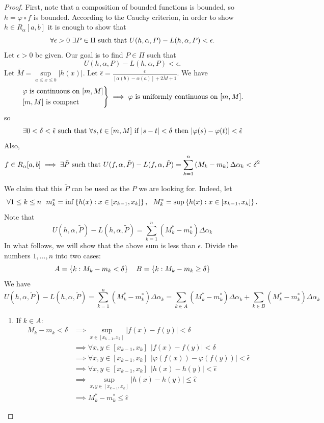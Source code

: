 \begin{proof}
    First, note that a composition of bounded functions is bounded, so $h = \varphi \circ f$ is bounded. According to the Cauchy criterion, in order to show $h \in R_\alpha[a,b]$ it is enough to show that 
    $$\forall \epsilon > 0 ~\exists P \in \Pi \text{ such that } U(h, \alpha, P) - L(h, \alpha, P) < \epsilon.$$
    Let $\epsilon > 0$ be given. Our goal is to find $P \in \Pi$ such that 
    $$U(h, \alpha, P) - L(h, \alpha, P) < \epsilon.$$
    Let $\tilde{M} = \sup \limits_{a \leq x \leq b} |h(x)|$. Let $\hat{\epsilon} = \frac{\epsilon}{[\alpha(b) - \alpha(a)] + 2\tilde{M} + 1}.$ We have
    $$\begin{rcases*}
        \varphi \text{ is continuous on } [m,M] \\
        [m,M] \text{ is compact}
    \end{rcases*} \implies \varphi \text{ is uniformly continuous on $[m,M]$.}$$
    so
    $$\exists 0 < \delta < \hat{\epsilon} \text{ such that } \forall s,t \in [m, M] \text{ if $|s-t| < \delta$ then $|\varphi(s)-\varphi(t)| < \hat{\epsilon}$}$$
    Also,
    $$f \in R_\alpha[a,b] \implies \exists \tilde{P} \text{ such that } U(f, \alpha, \tilde{P}) - L(f, \alpha, \tilde{P}) = \sum_{k=1}^{n}\left(M_k - m_k\right)\Delta \alpha_k < \delta^2$$

    We claim that this $\tilde{P}$ can be used as the $P$ we are looking for. Indeed, let 
    $$\forall 1 \leq k \leq n ~~m_k^* = \inf \left\{h(x) : x \in [x_{k-1},x_k]\right\}, ~~M_k^* = \sup \left\{h(x) : x \in [x_{k-1}, x_k]\right\}.$$
    Note that 
    $$U(h, \alpha, \tilde{P}) - L(h, \alpha, \tilde{P}) = \sum_{k=1}^{n}\left(M_k^* - m_k^*\right)\Delta \alpha_k$$
    In what follows, we will show that the above sum is less than $\epsilon$. Divide the numbers $1, ..., n$ into two cases:
    $$A = \left\{k : M_k - m_k < \delta\right\} ~~~B = \left\{k : M_k - m_k \geq \delta\right\}$$
    We have
    \begin{equation*}
        U(h, \alpha, \tilde{P}) - L(h, \alpha, \tilde{P}) = \sum_{k=1}^{n} \left(M_k^* - m_k^*\right)\Delta \alpha_k = \sum_{k \in A}\left(M_k^* - m_k^*\right)\Delta \alpha_k + \sum_{k \in B}\left(M_k^* - m_k^*\right)\Delta \alpha_k
        \tag{I}
    \end{equation*}
    \begin{enumerate}[$*)$]
        \item If $k \in A$:
        \begin{align*}
            M_k - m_k < \delta &\implies \sup \limits_{x \in [x_{k-1}, x_k]} |f(x) - f(y)| < \delta \\
            &\implies \forall x, y \in [x_{k-1}, x_k] ~~|f(x) - f(y)| < \delta \\
            &\implies \forall x, y \in [x_{k-1}, x_k] ~~|\varphi(f(x)) - \varphi(f(y))| < \hat{\epsilon} \\
            &\implies \forall x, y \in [x_{k-1}, x_k] ~~|h(x) - h(y)| < \hat{\epsilon} \\
            &\implies \sup \limits_{x,y \in [x_{k-1},x_k]} |h(x) - h(y)| \leq \hat{\epsilon} \\
            &\implies M_k^* - m_k^* \leq \hat{\epsilon}
            \tag{II}
        \end{align*}


\end{enumerate}
\end{proof}
